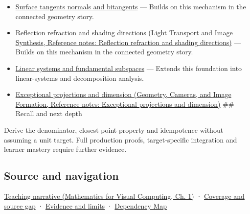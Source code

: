 \begin{itemize}
\item
  \hyperref[appendix-e31893dec985]{Surface tangents normals and bitangents} --- Builds on this mechanism in the connected geometry story.
\item
  \href{../04-Light-Transport-and-Image-Synthesis/main.pdf\#nameddest=appendix-44e00863b4d5}{Reflection refraction and shading directions (Light Transport and Image Synthesis, Reference notes: Reflection refraction and shading directions)} --- Builds on this mechanism in the connected geometry story.
\item
  \hyperref[appendix-8572a4a060c1]{Linear systems and fundamental subspaces} --- Extends this foundation into linear-systems and decomposition analysis.
\item
  \href{../03-Geometry-Cameras-and-Image-Formation/main.pdf\#nameddest=appendix-3c73f7862157}{Exceptional projections and dimension (Geometry, Cameras, and Image Formation, Reference notes: Exceptional projections and dimension)} \#\# Recall and next depth
\end{itemize}

Derive the denominator, closest-point property and idempotence without assuming a unit target. Full production proofs, target-specific integration and learner mastery require further evidence.

\subsection{Source and navigation}\label{appendix-505a502c372a-source-and-navigation}

\href{../02-Mathematics-for-Visual-Computing/main.pdf\#nameddest=01-foundations-i-ch017-projection-separates-useful-movement-from-sideways-movement}{Teaching narrative (Mathematics for Visual Computing, Ch. 1)} · \hyperref[appendix-fd090d982a15-phase-6---parts-501-600]{Coverage and source gap} · \hyperref[appendix-a103e7846d21-phase-6---source-analysis-and-verification]{Evidence and limits} · \hyperref[appendix-4ad47bdd269a]{Dependency Map}
